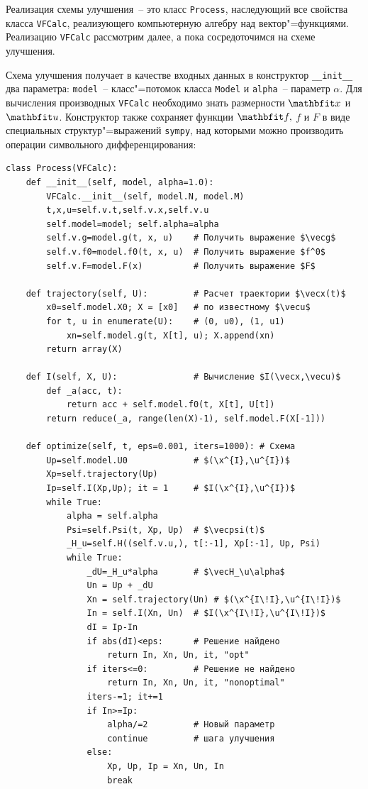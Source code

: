 \documentclass[a4paper,14pt, openany, twoside, final]{extbook} %
\begin{document}
Реализация схемы улучшения~-- это класс \texttt{Process}, наследующий все свойства класса \texttt{VFCalc}, реализующего компьютерную алгебру над вектор"=функциями.  Реализацию \texttt{VFCalc} рассмотрим далее, а пока сосредоточимся на схеме улучшения.

Схема улучшения получает в качестве входных данных в конструктор \texttt{\_\_init\_\_} два параметра: \texttt{model}~-- класс"=потомок класса \texttt{Model} и \texttt{alpha}~-- параметр $\alpha$.  Для вычисления производных \texttt{VFCalc} необходимо знать размерности $\vecx$ и $\vecu$.  Конструктор также сохраняет функции $\vecf,$ $f$ и $F$ в виде специальных структур"=выражений \texttt{sympy}, над которыми можно производить операции символьного дифференцирования:

\begin{verbatim}
class Process(VFCalc):
    def __init__(self, model, alpha=1.0):
        VFCalc.__init__(self, model.N, model.M)
        t,x,u=self.v.t,self.v.x,self.v.u
        self.model=model; self.alpha=alpha
        self.v.g=model.g(t, x, u)    # Получить выражение $\vecg$
        self.v.f0=model.f0(t, x, u)  # Получить выражение $f^0$
        self.v.F=model.F(x)          # Получить выражение $F$

    def trajectory(self, U):         # Расчет траектории $\vecx(t)$
        x0=self.model.X0; X = [x0]   # по известному $\vecu$
        for t, u in enumerate(U):    # (0, u0), (1, u1)
            xn=self.model.g(t, X[t], u); X.append(xn)
        return array(X)

    def I(self, X, U):               # Вычисление $I(\vecx,\vecu)$
        def _a(acc, t):
            return acc + self.model.f0(t, X[t], U[t])
        return reduce(_a, range(len(X)-1), self.model.F(X[-1]))

    def optimize(self, t, eps=0.001, iters=1000): # Схема
        Up=self.model.U0             # $(\x^{I},\u^{I})$
        Xp=self.trajectory(Up)
        Ip=self.I(Xp,Up); it = 1     # $I(\x^{I},\u^{I})$
        while True:
            alpha = self.alpha
            Psi=self.Psi(t, Xp, Up)  # $\vecpsi(t)$
            _H_u=self.H((self.v.u,), t[:-1], Xp[:-1], Up, Psi)
            while True:
                _dU=_H_u*alpha       # $\vecH_\u\alpha$
                Un = Up + _dU
                Xn = self.trajectory(Un) # $(\x^{I\!I},\u^{I\!I})$
                In = self.I(Xn, Un)  # $I(\x^{I\!I},\u^{I\!I})$
                dI = Ip-In
                if abs(dI)<eps:      # Решение найдено
                    return In, Xn, Un, it, "opt"
                if iters<=0:         # Решение не найдено
                    return In, Xn, Un, it, "nonoptimal"
                iters-=1; it+=1
                if In>=Ip:
                    alpha/=2         # Новый параметр
                    continue         # шага улучшения
                else:
                    Xp, Up, Ip = Xn, Un, In
                    break
\end{verbatim}
\end{document}
